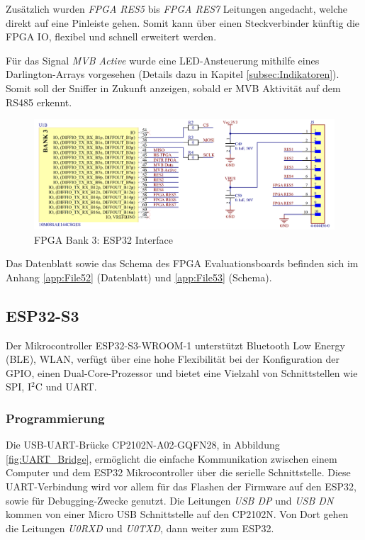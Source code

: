 Zusätzlich wurden \textit{FPGA RES5} bis \textit{FPGA RES7} Leitungen angedacht, welche direkt auf eine Pinleiste gehen. Somit kann über einen Steckverbinder künftig die FPGA IO, flexibel und schnell erweitert werden.

Für das Signal \textit{MVB Active} wurde eine LED-Ansteuerung mithilfe eines Darlington-Arrays vorgesehen (Details dazu in Kapitel \ref{subsec:Indikatoren}). Somit soll der Sniffer in Zukunft anzeigen, sobald er MVB Aktivität auf dem RS485 erkennt.

\begin{figure}[H]
    \centering
    \includegraphics[width=1.0\linewidth]{Figures/Chap3/Schematics/Bank3_ESP.png}
    \caption{FPGA Bank 3: ESP32 Interface}
    \label{FPGA ESP}
\end{figure}

Das Datenblatt sowie das Schema des FPGA Evaluationsboards befinden sich im Anhang \ref{app:File52} (Datenblatt) und \ref{app:File53} (Schema).

\subsection{ESP32-S3}
Der Mikrocontroller ESP32-S3-WROOM-1 unterstützt Bluetooth Low Energy (BLE), WLAN, verfügt über eine hohe Flexibilität bei der Konfiguration der GPIO, einen Dual-Core-Prozessor und bietet eine Vielzahl von Schnittstellen wie SPI, I$^2$C und UART.

\subsubsection{Programmierung}
Die USB-UART-Brücke CP2102N-A02-GQFN28, in Abbildung \ref{fig:UART_Bridge}, ermöglicht die einfache Kommunikation zwischen einem Computer und dem ESP32 Mikrocontroller über die serielle Schnittstelle. Diese UART-Verbindung wird vor allem für das Flashen der Firmware auf den ESP32, sowie für Debugging-Zwecke genutzt. Die Leitungen \textit{USB DP} und \textit{USB DN} kommen von einer Micro USB Schnittstelle auf den CP2102N. Von Dort gehen die Leitungen \textit{U0RXD} und \textit{U0TXD}, dann weiter zum ESP32.

